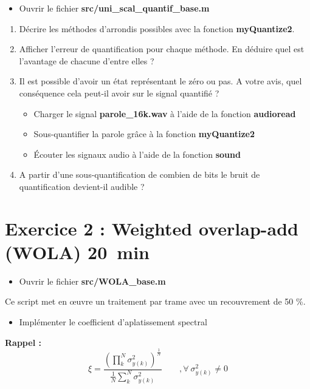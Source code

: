\documentclass{article}
\begin{document}
\begin{itemize}
	\item Ouvrir le fichier \textbf{src/uni\_scal\_quantif\_base.m}
\end{itemize}

\begin{enumerate}[label=\textbf{\arabic*})]
	\item Décrire les méthodes d'arrondis possibles avec la fonction \textbf{myQuantize2}.
	\item Afficher l'erreur de quantification pour chaque méthode. En déduire quel est l'avantage de chacune d'entre elles ?
	\item Il est possible d'avoir un état représentant le zéro ou pas. A votre avis, quel conséquence cela peut-il avoir sur le signal quantifié ?
	\begin{itemize}
		\item Charger le signal \textbf{parole\_16k.wav} à l'aide de la fonction \textbf{audioread}
		\item Sous-quantifier la parole grâce à la fonction \textbf{myQuantize2}
		\item Écouter les signaux audio à l'aide de la fonction \textbf{sound}
	\end{itemize}
	\item A partir d'une sous-quantification de combien de bits le bruit de quantification devient-il audible ?
\end{enumerate}

\section{Exercice 2 : Weighted overlap-add (WOLA) \small{20~min}}
\begin{itemize}
	\item Ouvrir le fichier \textbf{src/WOLA\_base.m}
\end{itemize}

Ce script met en \oe uvre un traitement par trame avec un recouvrement de 50 \%.
\begin{itemize}
	\item Implémenter le coefficient d'aplatissement spectral
\end{itemize}

\textbf{Rappel :}
		$$
		\xi = \frac{\left(\prod\limits_k^N \sigma_{y(k)}^2\right)^\frac{1}{N}}{\frac{1}{N} \sum\limits_k^N \sigma_{y(k)}^2}
		\qquad , \forall \ \sigma_{y(k)}^2 \neq 0
		$$
\end{document}
